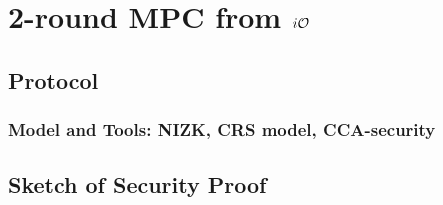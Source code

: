 \section{2-round MPC from $i\mathcal{O}$}





\begin{comment}
What to say:
- 
\end{comment}




\subsection{Protocol}

\subsubsection{Model and Tools: NIZK, CRS model, CCA-security}

\subsection{Sketch of Security Proof}

